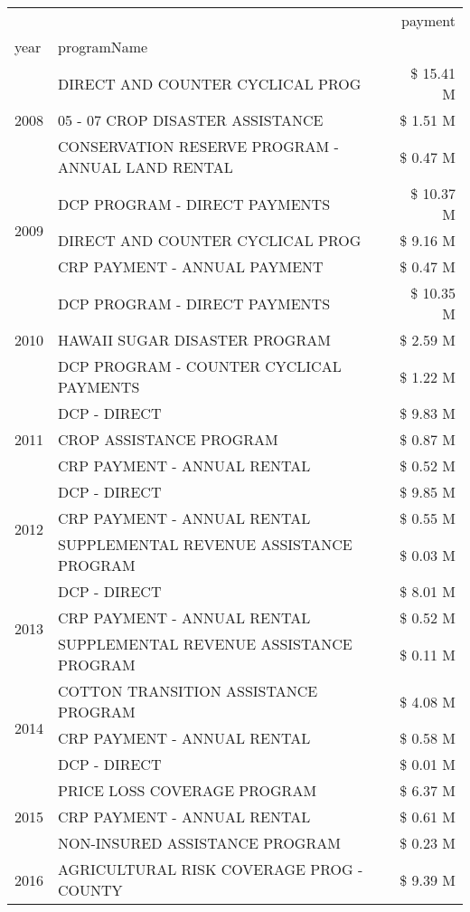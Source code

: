 \begin{tabular}{llr}
\toprule
 &  & payment \\
year & programName &  \\
\midrule
\multirow[t]{3}{*}{2008} & DIRECT AND COUNTER CYCLICAL PROG & \$ 15.41 M \\
 & 05 - 07 CROP DISASTER ASSISTANCE & \$ 1.51 M \\
 & CONSERVATION RESERVE PROGRAM - ANNUAL LAND RENTAL & \$ 0.47 M \\
\cline{1-3}
\multirow[t]{3}{*}{2009} & DCP PROGRAM - DIRECT PAYMENTS & \$ 10.37 M \\
 & DIRECT AND COUNTER CYCLICAL PROG & \$ 9.16 M \\
 & CRP PAYMENT - ANNUAL PAYMENT & \$ 0.47 M \\
\cline{1-3}
\multirow[t]{3}{*}{2010} & DCP PROGRAM - DIRECT PAYMENTS & \$ 10.35 M \\
 & HAWAII SUGAR DISASTER PROGRAM & \$ 2.59 M \\
 & DCP PROGRAM - COUNTER CYCLICAL PAYMENTS & \$ 1.22 M \\
\cline{1-3}
\multirow[t]{3}{*}{2011} & DCP - DIRECT & \$ 9.83 M \\
 & CROP ASSISTANCE PROGRAM & \$ 0.87 M \\
 & CRP PAYMENT - ANNUAL RENTAL & \$ 0.52 M \\
\cline{1-3}
\multirow[t]{3}{*}{2012} & DCP - DIRECT & \$ 9.85 M \\
 & CRP PAYMENT - ANNUAL RENTAL & \$ 0.55 M \\
 & SUPPLEMENTAL REVENUE ASSISTANCE PROGRAM & \$ 0.03 M \\
\cline{1-3}
\multirow[t]{3}{*}{2013} & DCP - DIRECT & \$ 8.01 M \\
 & CRP PAYMENT - ANNUAL RENTAL & \$ 0.52 M \\
 & SUPPLEMENTAL REVENUE ASSISTANCE PROGRAM & \$ 0.11 M \\
\cline{1-3}
\multirow[t]{3}{*}{2014} & COTTON TRANSITION ASSISTANCE PROGRAM & \$ 4.08 M \\
 & CRP PAYMENT - ANNUAL RENTAL & \$ 0.58 M \\
 & DCP - DIRECT & \$ 0.01 M \\
\cline{1-3}
\multirow[t]{3}{*}{2015} & PRICE LOSS COVERAGE PROGRAM & \$ 6.37 M \\
 & CRP PAYMENT - ANNUAL RENTAL & \$ 0.61 M \\
 & NON-INSURED ASSISTANCE PROGRAM & \$ 0.23 M \\
\cline{1-3}
\multirow[t]{3}{*}{2016} & AGRICULTURAL RISK COVERAGE PROG - COUNTY & \$ 9.39 M \\

\end{tabular}
